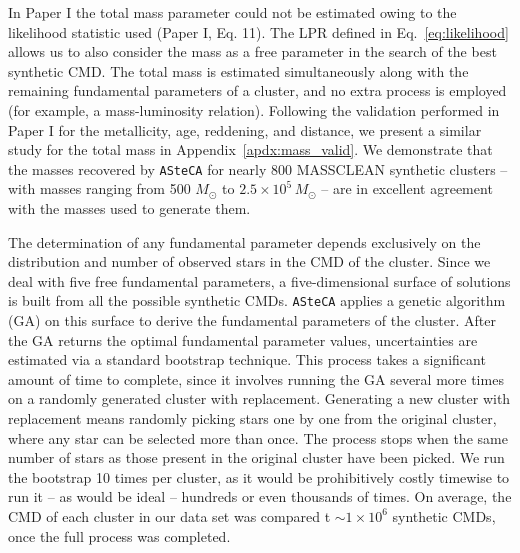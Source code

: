 \documentclass{aa}
\begin{document}
%
In Paper I the total mass parameter could not be estimated owing to the
likelihood statistic used (Paper I, Eq. 11). The LPR defined in
Eq.~\ref{eq:likelihood} allows us to also consider the mass as a free parameter
in the search of the best synthetic CMD.\@
%
The total mass is estimated simultaneously along with the remaining
fundamental parameters of a cluster, and no extra process is employed (for example,
a mass-luminosity relation).
%
Following the validation performed in Paper I for the metallicity, age,
reddening, and distance, we present a similar study for the total mass  in
Appendix~\ref{apdx:mass_valid}. We demonstrate that the masses recovered by
\texttt{ASteCA} for nearly 800 MASSCLEAN synthetic clusters -- with
masses ranging from 500 $M_{\odot}$ to $2.5\times10^5\,M_{\odot}$ -- are in
excellent agreement with the masses used to generate them.

The determination of any fundamental parameter depends exclusively on
the distribution and number of observed stars in the CMD of the cluster.\@
Since we deal with five free fundamental parameters, a five-dimensional surface of
solutions is built from all the possible synthetic CMDs.
\texttt{ASteCA} applies a genetic algorithm (GA) on this surface to derive the
fundamental parameters of the cluster.
%
%
After the GA returns the optimal fundamental parameter values, uncertainties are
estimated via a standard bootstrap technique. This process takes a significant
amount of time to complete, since it involves running the GA several more times
on a randomly generated cluster with replacement. Generating a new
cluster with replacement means randomly picking stars one by one from the
original cluster, where any star can be selected more than once. The process
stops when the same number of stars as those present in the original
cluster have been picked.
We run the bootstrap 10 times per cluster, as it would be prohibitively
costly timewise to run it -- as would be ideal -- hundreds or even thousands of
times.
On average, the CMD of each cluster in our data set was compared t
${\sim}1{\times}10^6$ synthetic CMDs, once the full process was completed.
\end{document}

